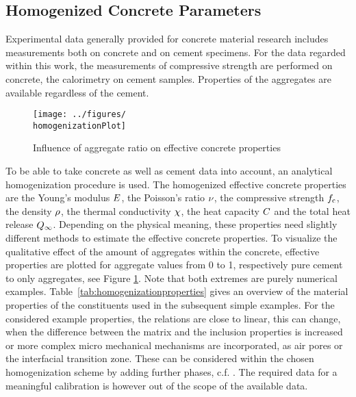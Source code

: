 \subsection{Homogenized Concrete Parameters}
Experimental data generally provided for concrete material research includes measurements both on concrete and on cement specimens.
For the data regarded within this work, the measurements of compressive strength are performed on concrete, the calorimetry on cement samples.
Properties of the aggregates are available regardless of the cement.\\
\begin{figure}[b]%
	\centering
	\texttt{[image: ../figures/\\homogenizationPlot]}
	\caption{Influence of aggregate ratio on effective concrete properties}\label{fig:homogenization}
\end{figure}
To be able to take concrete as well as cement data into account, an analytical homogenization procedure is used.
The homogenized effective concrete properties are the Young's modulus $E$, the Poisson's ratio $\nu$, the compressive strength $f_{\text{c}}$, the density $\rho$, the thermal conductivity $\chi$, the heat capacity $C$ and the total heat release $Q_{\infty}$.
Depending on the physical meaning, these properties need slightly different methods to estimate the effective concrete properties.
To visualize the qualitative effect of the amount of aggregates within the concrete, effective properties are plotted for aggregate values from 0 to 1, respectively pure cement to only aggregates, see Figure \ref{fig:homogenization}.
Note that both extremes are purely numerical examples.
\mbox{Table \ref{tab:homogenizationproperties}} gives an overview of the material properties of the constituents used in the subsequent simple examples.
For the considered example properties, the relations are close to linear, this can change, when the difference between the matrix and the inclusion properties is increased or more complex micro mechanical mechanisms are incorporated, as air pores or the interfacial transition zone.
These can be considered within the chosen homogenization scheme by adding further phases, c.f. \cite{nee_2012_ammf}.
The required data for a meaningful calibration is however out of the scope of the available data.
